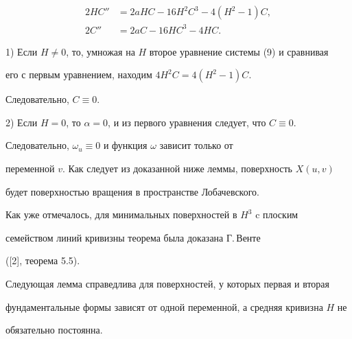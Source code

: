 \begin{pf}
\begin{equation}


\begin{split}


2HC''&=2aHC-16H^2C^3-4(H^2-1)C,\\


2C''&=2aC-16HC^3-4HC.


\end{split}


\end{equation}





1) Если $H \ne0$, то, умножая на $H$ второе уравнение системы (9) и сравнивая


его с первым уравнением, находим $4H^2C=4(H^2-1)C$.


Следовательно, $C\equiv 0$.





2) Если $H=0$, то $\alpha =0$, и из первого уравнения следует, что $C\equiv0$.





Следовательно, $\omega_u\equiv 0$ и функция $\omega$ зависит только от


переменной $v$. Как следует из доказанной ниже леммы, поверхность $X(u,v)$


будет поверхностью вращения в пространстве Лобачевского.


\end{pf}





Как уже отмечалось, для минимальных поверхностей в $H^3$ c плоским


семейством линий кривизны теорема была доказана Г.\,Венте


([2], теорема 5.5).


Следующая лемма справедлива для поверхностей, у которых первая и вторая


фундаментальные формы зависят от одной переменной, а средняя кривизна $H$ не


обязательно постоянна.






